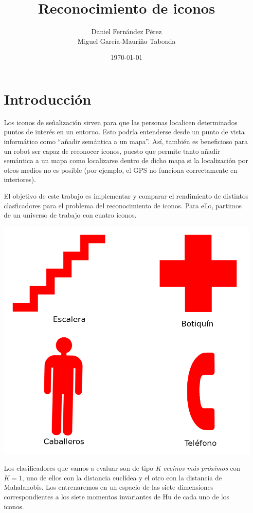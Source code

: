\documentclass[11pt]{article}
\author{Daniel Fernández Pérez\\Miguel García-Mauriño Taboada}
\date{\today}
\title{Reconocimiento de iconos}
\begin{document}
\begin{titlepage}
  \clearpage
  \maketitle
  \thispagestyle{empty}
\end{titlepage}
\pagebreak
\tableofcontents
\pagebreak
\section{Introducción}
Los iconos de señalización sirven para que las personas localicen determinados puntos de interés en un entorno. Esto podría entenderse desde un punto de vista informático como ``añadir semántica a un mapa''. Así, también es beneficioso para un robot ser capaz de reconocer iconos, puesto que permite tanto añadir semántica a un mapa como localizarse dentro de dicho mapa si la localización por otros medios no es posible (por ejemplo, el GPS no funciona correctamente en interiores).

El objetivo de este trabajo es implementar y comparar el rendimiento de distintos clasficadores para el problema del reconocimiento de iconos. Para ello, partimos de un universo de trabajo con cuatro iconos.

\includegraphics[width=.9\linewidth]{rsc/universo.png}

Los clasificadores que vamos a evaluar son de tipo \textit{K vecinos más próximos} con $K=1$, uno de ellos con la distancia euclídea y el otro con la distancia de Mahalanobis. Los entrenaremos en un espacio de las siete dimensiones correspondientes a los siete momentos invariantes de Hu de cada uno de los iconos.
\end{document}
